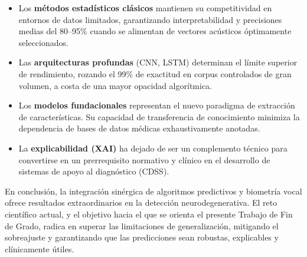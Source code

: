 \begin{itemize}
    \item Los \textbf{métodos estadísticos clásicos} mantienen su competitividad en entornos de datos limitados, garantizando interpretabilidad y precisiones medias del 80--95\% cuando se alimentan de vectores acústicos óptimamente seleccionados.
    \item Las \textbf{arquitecturas profundas} (CNN, LSTM) determinan el límite superior de rendimiento, rozando el 99\% de exactitud en corpus controlados de gran volumen, a costa de una mayor opacidad algorítmica.
    \item Los \textbf{modelos fundacionales} representan el nuevo paradigma de extracción de características. Su capacidad de transferencia de conocimiento minimiza la dependencia de bases de datos médicas exhaustivamente anotadas.
    \item La \textbf{explicabilidad (XAI)} ha dejado de ser un complemento técnico para convertirse en un prerrequisito normativo y clínico en el desarrollo de sistemas de apoyo al diagnóstico (CDSS).
\end{itemize}

En conclusión, la integración sinérgica de algoritmos predictivos y biometría vocal ofrece resultados extraordinarios en la detección neurodegenerativa. El reto científico actual, y el objetivo hacia el que se orienta el presente Trabajo de Fin de Grado, radica en superar las limitaciones de generalización, mitigando el sobreajuste y garantizando que las predicciones sean robustas, explicables y clínicamente útiles.